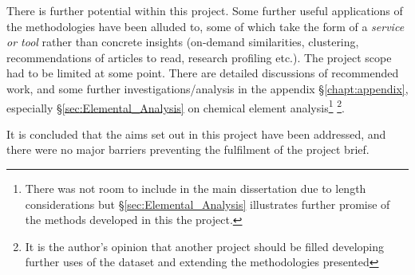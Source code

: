 There is further potential within this project. Some further useful applications of the methodologies have been alluded to, some of which take the form of a \emph{service or tool} rather than concrete insights (on-demand similarities, clustering, recommendations of articles to read, research profiling etc.). The project scope had to be limited at some point. There are detailed discussions of recommended work, and some further investigations/analysis in the appendix \S\ref{chapt:appendix}, especially \S\ref{sec:Elemental_Analysis} on chemical element analysis\footnote{There was not room to include in the main dissertation due to length considerations but \S\ref{sec:Elemental_Analysis} illustrates further promise of the methods developed in this the project.} \footnote{It is the author's opinion that another project should be filled developing further uses of the dataset and extending the methodologies presented}.

It is concluded that the aims set out in this project have been addressed, and there were no major barriers preventing the fulfilment of the project brief. 